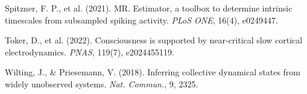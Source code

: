 \documentclass[11pt]{article}
\begin{document}
\begin{list}{}{\setlength{\itemsep}{1pt}\setlength{\leftmargin}{1.2em}\setlength{\itemindent}{-1.2em}}
\item Spitzner, F. P., et al. (2021). MR. Estimator, a toolbox to determine intrinsic timescales from subsampled spiking activity. \emph{PLoS ONE}, 16(4), e0249447.
\item Toker, D., et al. (2022). Consciousness is supported by near-critical slow cortical electrodynamics. \emph{PNAS}, 119(7), e2024455119.
\item Wilting, J., \& Priesemann, V. (2018). Inferring collective dynamical states from widely unobserved systems. \emph{Nat. Commun.}, 9, 2325.
\end{list}\endgroup
\end{document}
